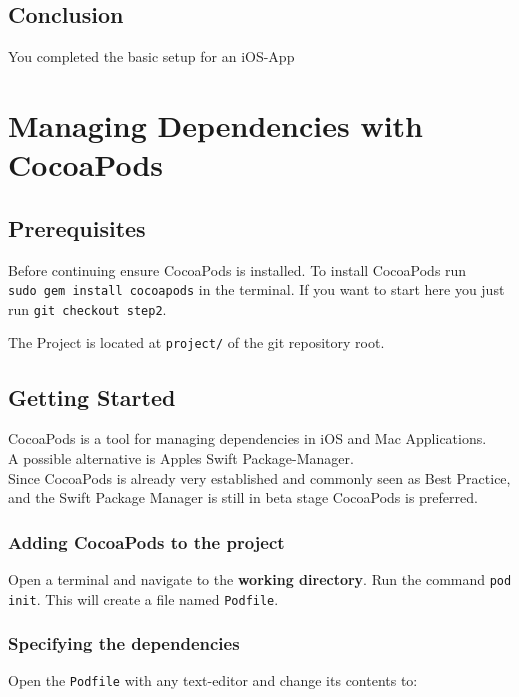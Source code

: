 \documentclass{article}
\begin{document}
\subsection{Conclusion}\label{step1:conclusion}

You completed the basic setup for an iOS-App


\section{Managing Dependencies with
CocoaPods}\label{step2}

\subsection{Prerequisites}\label{step2:prerequisites}

Before continuing ensure CocoaPods is installed.
To install CocoaPods run \texttt{sudo\ gem\ install\ cocoapods} in the terminal.
\newline
If you want to start here you just run \texttt{git\ checkout\ step2}.

The Project is located at \texttt{project/} of the git repository root.

\subsection{Getting Started}\label{step2:getting-started}

CocoaPods\citep{08-cocoapods} is a tool for managing dependencies in iOS and Mac Applications.
\\
A possible alternative is Apples Swift Package-Manager\citep{09-swift-package-manager}.
\\
Since CocoaPods is already very established and commonly seen as Best
Practice, and the Swift Package Manager is still in beta
stage CocoaPods is preferred.


\subsubsection{Adding CocoaPods to the project}
Open a terminal and navigate to the \textbf{working directory}.
Run the command \texttt{pod init}.
This will create a file named \texttt{Podfile}.

\subsubsection{Specifying the dependencies}
Open the \texttt{Podfile} with any text-editor and change its contents to:
\end{document}
